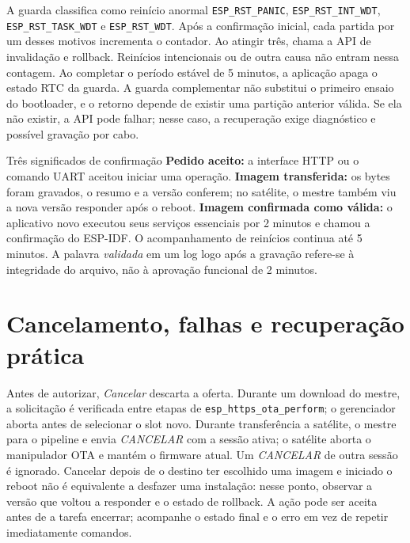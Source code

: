 A guarda classifica como reinício anormal \texttt{ESP\_RST\_PANIC}, \texttt{ESP\_RST\_INT\_WDT}, \texttt{ESP\_RST\_TASK\_WDT} e \texttt{ESP\_RST\_WDT}. Após a confirmação inicial, cada partida por um desses motivos incrementa o contador. Ao atingir três, chama a API de invalidação e rollback. Reinícios intencionais ou de outra causa não entram nessa contagem. Ao completar o período estável de 5 minutos, a aplicação apaga o estado RTC da guarda. A guarda complementar não substitui o primeiro ensaio do bootloader, e o retorno depende de existir uma partição anterior válida. Se ela não existir, a API pode falhar; nesse caso, a recuperação exige diagnóstico e possível gravação por cabo.

\begin{nota}{Três significados de confirmação}
\textbf{Pedido aceito:} a interface HTTP ou o comando UART aceitou iniciar uma operação. \textbf{Imagem transferida:} os bytes foram gravados, o resumo e a versão conferem; no satélite, o mestre também viu a nova versão responder após o reboot. \textbf{Imagem confirmada como válida:} o aplicativo novo executou seus serviços essenciais por 2 minutos e chamou a confirmação do ESP-IDF. O acompanhamento de reinícios continua até 5 minutos. A palavra \emph{validada} em um log logo após a gravação refere-se à integridade do arquivo, não à aprovação funcional de 2 minutos.
\end{nota}

\section{Cancelamento, falhas e recuperação prática}
Antes de autorizar, \emph{Cancelar} descarta a oferta. Durante um download do mestre, a solicitação é verificada entre etapas de \texttt{esp\_https\_ota\_perform}; o gerenciador aborta antes de selecionar o slot novo. Durante transferência a satélite, o mestre para o pipeline e envia \emph{CANCELAR} com a sessão ativa; o satélite aborta o manipulador OTA e mantém o firmware atual. Um \emph{CANCELAR} de outra sessão é ignorado. Cancelar depois de o destino ter escolhido uma imagem e iniciado o reboot não é equivalente a desfazer uma instalação: nesse ponto, observar a versão que voltou a responder e o estado de rollback. A ação pode ser aceita antes de a tarefa encerrar; acompanhe o estado final e o erro em vez de repetir imediatamente comandos.

